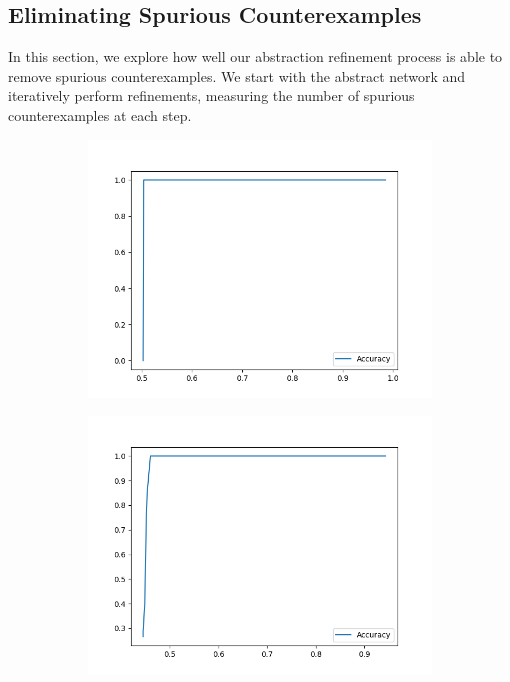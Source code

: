 \subsection{Eliminating Spurious Counterexamples}
\label{s:exp-mnist-rob}

In this section, we explore how well our abstraction refinement process is able
to remove spurious counterexamples. We start with the abstract network and
iteratively perform refinements, measuring the number of spurious
counterexamples at each step. 

\begin{figure}

    \begin{subfigure}{0.475\linewidth}
        \includegraphics[scale=0.4]{figs/mnist_2_256_prop_0_0.03_samples.png}
        \caption{}
        \label{f:mnist-prop-samples}
    \end{subfigure}
    \begin{subfigure}{0.475\linewidth}
        \includegraphics[scale=0.4]{figs/acas_ncex_5_8_3_samples.png}
        \caption{}
        \label{f:acas-ncex-samples}
    \end{subfigure}


\end{figure}

